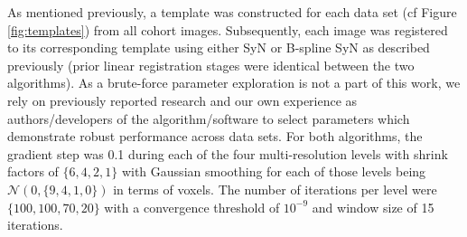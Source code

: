 \documentclass{frontiersSCNS}
\begin{document}

As mentioned previously, a template was constructed for each data
set (cf Figure \ref{fig:templates}) from all cohort images.  Subsequently, 
each image was registered to its corresponding template using either 
SyN or B-spline SyN as described previously (prior linear registration 
stages were identical between the two algorithms).  As a brute-force parameter
exploration is not a part of this work, we rely on previously
reported research \citep{klein2009,avants2011} and our own experience as
authors/developers of the algorithm/software to select parameters which 
demonstrate robust performance across data sets.  For both algorithms,
the gradient step was 0.1 during each of the four multi-resolution levels
with shrink factors of $\{6,4,2,1\}$ with Gaussian smoothing for each
of those levels being $\mathcal{N}\left(0,\{9,4,1,0\}\right)$ in terms
of voxels.  The number of iterations per level were $\{100,100,70,20\}$
with a convergence threshold of $10^{-9}$ and window size of 15 iterations.
\end{document}
